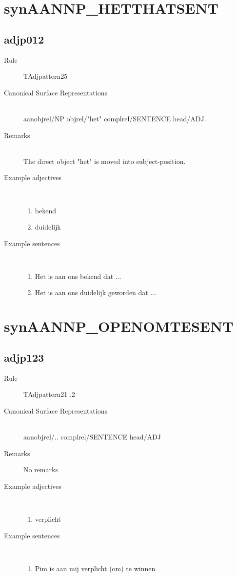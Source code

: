 \section{synAANNP\_HETTHATSENT}
\subsection{adjp012}
\begin{description}
  \item [Rule] TAdjpattern25
  \item [Canonical Surface Representations]  \mbox{}\\ 
aanobjrel/NP objrel/"het" complrel/SENTENCE head/ADJ.
  \item [Remarks] \mbox{}\\
The direct object "het" is moved into subject-position.

  \item [Example adjectives]\mbox{}\
\begin{enumerate}
  \item bekend 
  \item duidelijk
\end{enumerate}
  \item [Example sentences]\mbox{}\\
\begin{enumerate}
  \item Het is aan ons bekend dat ...
  \item Het is aan ons  duidelijk geworden dat ...
\end{enumerate}
\end{description}
\newpage
\section{synAANNP\_OPENOMTESENT}
\subsection{adjp123}
\begin{description}
  \item [Rule] TAdjpattern21 .2
  \item [Canonical Surface Representations]  \mbox{}\\ aanobjrel/.. 
complrel/SENTENCE head/ADJ
  \item [Remarks] No remarks

  \item [Example adjectives]\mbox{}\\
\begin{enumerate}
  \item verplicht
\end{enumerate}
  \item [Example sentences]\mbox{}\\
\begin{enumerate}
  \item Pim is aan mij verplicht (om) te winnen
\end{enumerate}
\end{description}
\newpage
